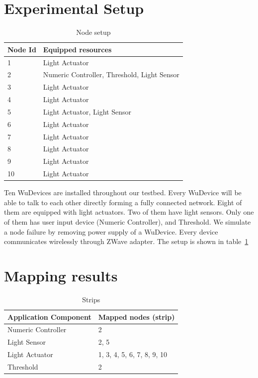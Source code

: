 \section{Experimental Setup}


\begin{table}
\centering
\caption{Node setup}
\label{tbl:setup}
  \begin{tabular}{|l|l|}
  \hline
  \textbf{Node Id} & \textbf{Equipped resources} \\
  \hline
  1 & Light Actuator \\
  \hline
  2 & Numeric Controller, Threshold, Light Sensor \\
  \hline
  3 & Light Actuator \\
  \hline
  4 & Light Actuator \\
  \hline
  5 & Light Actuator, Light Sensor \\
  \hline
  6 & Light Actuator \\
  \hline
  7 & Light Actuator \\
  \hline
  8 & Light Actuator \\
  \hline
  9 & Light Actuator \\
  \hline
  10 & Light Actuator \\
  \hline
  \end{tabular}
\end{table}

Ten WuDevices are installed throughout our testbed. Every WuDevice will be
able to talk to each other directly forming a fully connected network. Eight of them are
equipped with light actuators. Two of them have light sensors. Only one of them
has user input device (Numeric Controller), and Threshold. We simulate a node
failure by removing power supply of a WuDevice. Every device communicates
wirelessly through ZWave adapter. The setup is shown in table~\ref{tbl:setup}

\section{Mapping results}

\begin{table}
\centering
\caption{Strips}
\label{tbl:mapping-result}
  \begin{tabular}{|l|l|}
  \hline
  \textbf{Application Component} & \textbf{Mapped nodes (strip)} \\
  \hline
  Numeric Controller & 2 \\
  \hline
  Light Sensor & 2, 5 \\
  \hline
  Light Actuator & 1, 3, 4, 5, 6, 7, 8, 9, 10 \\
  \hline
  Threshold & 2 \\
  \hline
  \end{tabular}
\end{table}

